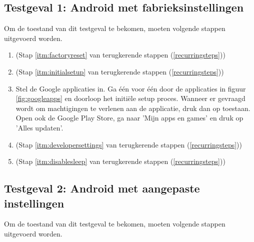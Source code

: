 \subsection{Testgeval 1: Android met fabrieksinstellingen}

Om de toestand van dit testgeval te bekomen, moeten volgende stappen uitgevoerd worden.
\begin{enumerate}
    \item 
     (Stap \ref{itm:factoryreset} van terugkerende stappen (\ref{recurringsteps}))
    
    \item 
     (Stap \ref{itm:initialsetup} van terugkerende stappen (\ref{recurringsteps}))
    
    \item 
    Stel de Google applicaties in. Ga één voor één door de applicaties in figuur \ref{fig:googleapps} en doorloop  het initiële setup proces. Wanneer er gevraagd wordt om machtigingen te verlenen aan de applicatie, druk dan op toestaan. Open ook de Google Play Store, ga naar 'Mijn apps en games' en druk op 'Alles updaten'.
    
    \item 
     (Stap \ref{itm:developersettings} van terugkerende stappen (\ref{recurringsteps}))
    
    \item 
     (Stap \ref{itm:disablesleep} van terugkerende stappen (\ref{recurringsteps}))
\end{enumerate}


\subsection{Testgeval 2: Android met aangepaste instellingen}

Om de toestand van dit testgeval te bekomen, moeten volgende stappen uitgevoerd worden.

